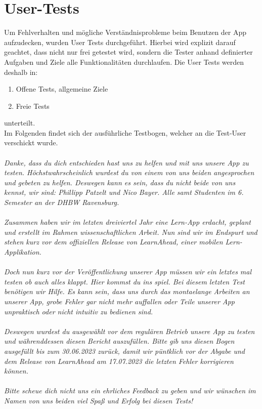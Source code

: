 \section{User-Tests}
Um Fehlverhalten und mögliche Verständnisprobleme beim Benutzen der App aufzudecken, wurden User Tests durchgeführt. Hierbei wird explizit darauf geachtet, dass nicht nur frei getestet wird, sondern die Tester anhand definierter Aufgaben und Ziele alle Funktionalitäten durchlaufen. \newline
Die User Tests werden deshalb in:
\begin{enumerate}
    \item Offene Tests, allgemeine Ziele
    \item Freie Tests
\end{enumerate}
unterteilt.\\ Im Folgenden findet sich der ausführliche Testbogen, welcher an die Test-User verschickt wurde.\\\\
\textit{
    Danke, dass du dich entschieden hast uns zu helfen und mit uns unsere App zu testen.
    Höchstwahrscheinlich wurdest du von einem von uns beiden angesprochen und gebeten zu helfen.
    Deswegen kann es sein, dass du nicht beide von uns kennst, wir sind: Phillipp Patzelt und Nico Bayer.
    Alle samt Studenten im 6. Semester an der DHBW Ravensburg.\\\\
    Zusammen haben wir im letzten dreiviertel Jahr eine Lern-App erdacht, geplant und erstellt im Rahmen wissenschaftlichen Arbeit.
    Nun sind wir im Endspurt und stehen kurz vor dem offiziellen Release von LearnAhead, einer mobilen Lern-Applikation.\\\\
    Doch nun kurz vor der Veröffentlichung unserer App müssen wir ein letztes mal testen ob auch alles klappt. Hier kommst du ins spiel.
    Bei diesem letzten Test benötigen wir Hilfe. Es kann sein, dass uns durch das montaelange Arbeiten an unserer App, grobe Fehler gar nicht mehr auffallen oder Teile unserer App unpraktisch oder nicht intuitiv zu bedienen sind.\\\\
    Deswegen wurdest du ausgewählt vor dem regulären Betrieb unsere App zu testen und währenddessen diesen Bericht auszufüllen. Bitte gib uns diesen Bogen ausgefüllt bis zum 30.06.2023 zurück, damit wir püntklich vor der Abgabe und dem Release von LearnAhead am 17.07.2023 die letzten Fehler korrigieren können.\\\\
    Bitte scheue dich nicht uns ein ehrliches Feedback zu geben und wir wünschen im Namen von uns beiden viel Spaß und Erfolg bei diesen Tests!
}
